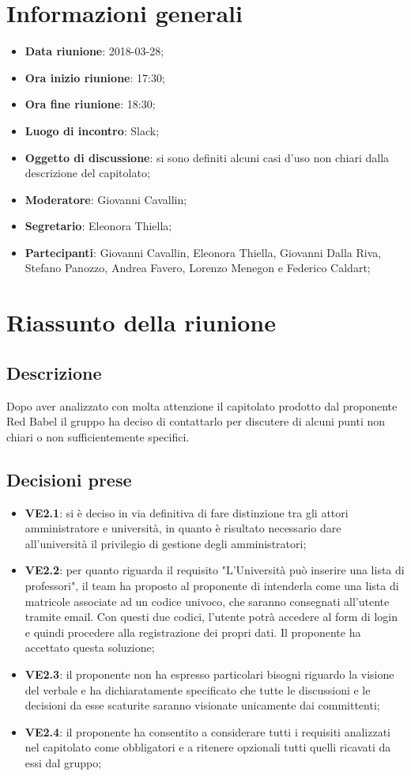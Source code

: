 \section{Informazioni generali}
	\begin{itemize}
		\item \textbf{Data riunione}: 2018-03-28;
		\item \textbf{Ora inizio riunione}: 17:30;
		\item \textbf{Ora fine riunione}: 18:30;
		\item \textbf{Luogo di incontro}: Slack;
		\item \textbf{Oggetto di discussione}: si sono definiti alcuni casi d'uso non chiari dalla descrizione del capitolato;
		\item \textbf{Moderatore}: Giovanni Cavallin;
		\item \textbf{Segretario}: Eleonora Thiella;
		\item \textbf{Partecipanti}: Giovanni Cavallin, Eleonora Thiella, Giovanni Dalla Riva, Stefano Panozzo, Andrea Favero, Lorenzo Menegon e Federico Caldart;
	\end{itemize}

\section{Riassunto della riunione}
	\subsection{Descrizione}
	Dopo aver analizzato con molta attenzione il capitolato prodotto dal proponente Red Babel il gruppo ha deciso di contattarlo per discutere di alcuni punti non chiari o non sufficientemente specifici.
	\subsection{Decisioni prese}
		\begin{itemize}
			\item \textbf{VE2.1}: si è deciso in via definitiva di fare distinzione tra gli attori amministratore e università, in quanto è risultato necessario dare all'università il privilegio di gestione degli amministratori;
			\item \textbf{VE2.2}: per quanto riguarda il requisito "L'Università può inserire una lista di professori", il team ha proposto al proponente di intenderla come una lista di matricole associate ad un codice univoco, che saranno consegnati all'utente tramite email. Con questi due codici, l'utente potrà accedere al form di login e quindi procedere alla registrazione dei propri dati. Il proponente ha accettato questa soluzione;
			\item \textbf{VE2.3}: il proponente non ha espresso particolari bisogni riguardo la visione del verbale e ha dichiaratamente specificato che tutte le discussioni e le decisioni da esse scaturite saranno visionate unicamente dai committenti;
			\item \textbf{VE2.4}: il proponente ha consentito a considerare tutti i requisiti analizzati nel capitolato come obbligatori e a ritenere opzionali tutti quelli ricavati da essi dal gruppo;
		\end{itemize}